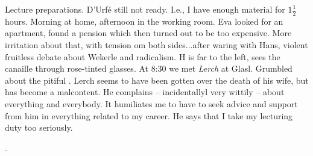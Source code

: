 
Lecture preparations. D'Urfé still not ready. I.e., I have enough material for $1\frac{1}{2}$ hours. Morning at home, afternoon in the working room. Eva looked for an apartment, found a pension which then turned out to be too expensive. More irritation about that, with tension om both sides...after waring with Hans, violent fruitless debate about Wekerle and radicalism. H is far to the left, sees the canaille through rose-tinted glasses. At 8:30 we met \textit{Lerch} at Glasl. Grumbled about the pitiful . Lerch seems to have been gotten over the death of his wife, but has become a malcontent. He complains -- incidentallyl very wittily -- about everything and everybody. It humiliates me to have to seek advice and support from him in everything related to my career. He says that I take my lecturing duty too seriously.

.